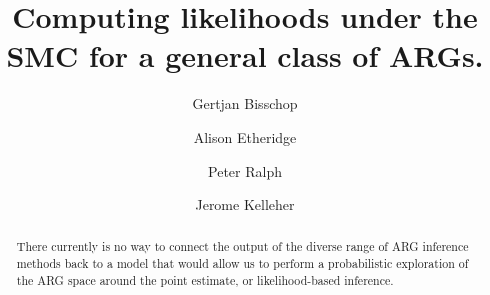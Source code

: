 \documentclass{article}
\begin{document}
\linenumbers
\title{Computing likelihoods under the SMC for a general class of ARGs.}

\author[1, $\dagger$]{Gertjan Bisschop}

\author[2]{Alison Etheridge}
\author[3]{Peter Ralph}

\author[1]{Jerome Kelleher}

\maketitle


\begin{abstract}
There currently is no way to connect the output of the diverse
range of ARG inference methods back
to a model that would allow us to perform a probabilistic exploration of the
ARG space around the point estimate, or likelihood-based inference.
\end{abstract}
\end{document}
